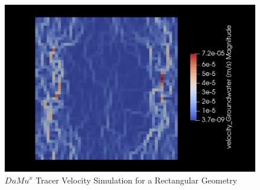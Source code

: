 \begin{figure}[h]
\centering
\includegraphics[width=162mm]{tracer_velocity}
\caption{\footnotesize $DuMu^x$ Tracer Velocity Simulation for a Rectangular Geometry}
\label{fig:tracer_velocity}
\end{figure}